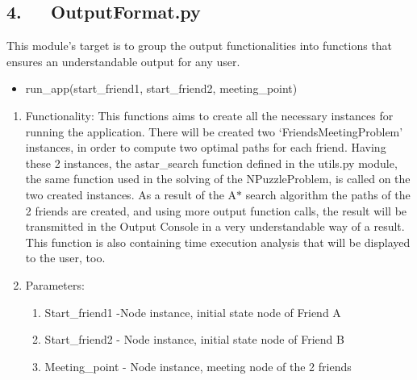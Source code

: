 \documentclass[12pt]{article}
\begin{document}
\vspace{\baselineskip}
\vspace{\baselineskip}

\vspace{\baselineskip}
\subsection*{4.\ \ \  \hspace*{10pt}OutputFormat.py}
\begin{adjustwidth}{0.5in}{0.0in}
\begin{justify}
This module’s target is to group the output functionalities into functions that ensures an understandable output for any user. 
\end{justify}\par

\end{adjustwidth}

\begin{itemize}
	\item run\_app(start\_friend1, start\_friend2, meeting\_point) 
\end{itemize}\par

\begin{enumerate}
	\item Functionality: This functions aims to create all the necessary instances for running the application. There will be created two ‘FriendsMeetingProblem’ instances, in order to compute two optimal paths for each friend. Having these 2 instances, the astar\_search function defined in the utils.py module, the same function used in the solving of the NPuzzleProblem, is called on the two created instances. As a result of the A$\ast$  search algorithm the paths of the 2 friends are created, and using more output function calls, the result will be transmitted in the Output Console in a very understandable way of a result. This function is also containing time execution analysis that will be displayed to the user, too.\par

	\item Parameters:\par

\begin{enumerate}
	\item Start\_friend1 -Node instance, initial state node of Friend A\par

	\item Start\_friend2 - Node instance, initial state node of Friend B\par

	\item Meeting\_point - Node instance, meeting node of the 2 friends\tab 
\end{enumerate}
\end{enumerate}\par
\end{document}
